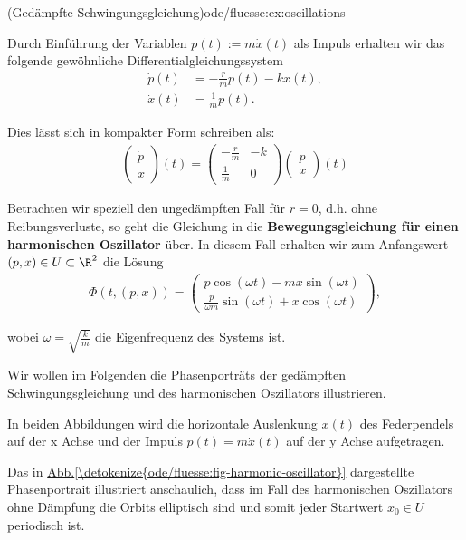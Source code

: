 \documentclass[letterpaper,10pt,german]{jupyterBook}
\begin{document}
\begin{example}{(Gedämpfte Schwingungsgleichung)}{ode/fluesse:ex:oscillations}
\par
Durch Einführung der Variablen \(p(t):= m\dot{x}(t)\) als Impuls erhalten wir das folgende gewöhnliche Differentialgleichungssystem
\begin{align*}
\dot{p}(t) &= - \frac{r}{m}p(t) -kx(t), \\
\dot{x}(t) &= \frac{1}{m}p(t).
\end{align*}
\par
Dies lässt sich in kompakter Form schreiben als:
\begin{align*}
\begin{pmatrix} \dot{p} \\ \dot{x} \end{pmatrix}(t) = \begin{pmatrix} -\frac{r}{m} & -k \\ \frac{1}{m} & 0\end{pmatrix} \begin{pmatrix}p \\ x\end{pmatrix}(t)
\end{align*}
\par
Betrachten wir speziell den ungedämpften Fall für \(r=0\), d.h. ohne Reibungsverluste, so geht die Gleichung in die \textbf{Bewegungsgleichung für einen harmonischen Oszillator} über.
In diesem Fall erhalten wir zum Anfangswert \((p,x) \in U \subset \R^2 \) die Lösung
\begin{align*}
\Phi(t, (p,x)) = 
\begin{pmatrix}
p \cos(\omega t) - m x \sin(\omega t) \\
\frac{p}{\omega m}\sin(\omega t) + x\cos(\omega t)
\end{pmatrix},
\end{align*}
\par
wobei \(\omega=\sqrt{\frac{k}{m}}\) die Eigenfrequenz des Systems ist.
\end{example}

\par
Wir wollen im Folgenden die Phasenporträts der gedämpften Schwingungsgleichung und des harmonischen Oszillators illustrieren.

\par
In beiden Abbildungen wird die horizontale Auslenkung \(x(t)\) des Federpendels auf der x Achse und der Impuls \(p(t) = m\dot{x}(t)\) auf der y Achse aufgetragen.

\par
Das in \hyperref[\detokenize{ode/fluesse:fig-harmonic-oscillator}]{Abb.\@ \ref{\detokenize{ode/fluesse:fig-harmonic-oscillator}}} dargestellte Phasenportrait illustriert anschaulich, dass im Fall des harmonischen Oszillators ohne Dämpfung die Orbits elliptisch sind und somit jeder Startwert \(x_0 \in U\) periodisch ist.
\end{document}
